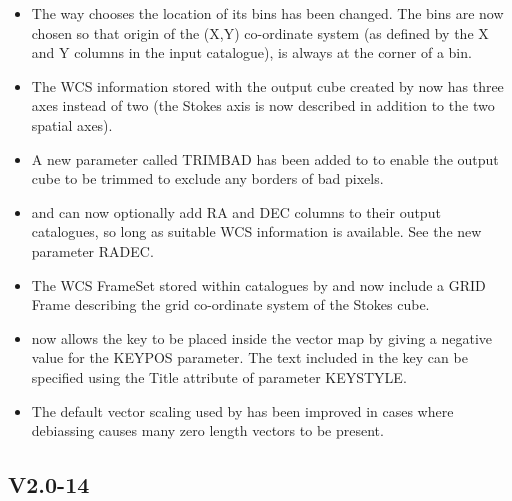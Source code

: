\documentclass[twoside,11pt]{starlink}
\begin{document}
\begin{itemize}
\item The way  chooses the location of its bins
has been changed. The bins are now chosen so that origin of the (X,Y)
co-ordinate system (as defined by the X and Y columns in the input
catalogue), is always at the corner of a bin.

\item The WCS information stored with the output cube created by
 now has three axes instead of two (the Stokes
axis is now described in addition to the two spatial axes).

\item A new parameter called TRIMBAD has been added to 
to enable the output cube to be trimmed to exclude any borders of bad pixels.

\item {} and  can now
optionally add RA and DEC columns to their output catalogues, so long as
suitable WCS information is available. See the new parameter RADEC.

\item The WCS FrameSet stored within catalogues by 
and  now include a GRID Frame describing the
grid co-ordinate system of the Stokes cube.

\item {} now allows the key to be placed inside the
vector map by giving a negative value for the KEYPOS parameter. The text
included in the key can be specified using the Title attribute of
parameter KEYSTYLE.

\item The default vector scaling used by  has been
improved in cases where debiassing causes many zero length vectors to be
present.

\end{itemize}

\subsection{V2.0-14}
\end{document}
